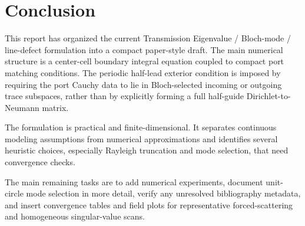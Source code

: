 %
%
%
%
%

\section{Conclusion}

This report has organized the current Transmission Eigenvalue / Bloch-mode /
line-defect formulation into a compact paper-style draft.  The main numerical
structure is a center-cell boundary integral equation coupled to compact port
matching conditions.  The periodic half-lead exterior condition is imposed by
requiring the port Cauchy data to lie in Bloch-selected incoming or outgoing
trace subspaces, rather than by explicitly forming a full half-guide
Dirichlet-to-Neumann matrix.

The formulation is practical and finite-dimensional.  It separates continuous
modeling assumptions from numerical approximations and identifies several
heuristic choices, especially Rayleigh truncation and mode selection, that need
convergence checks.

The main remaining tasks are to add numerical experiments, document unit-circle
mode selection in more detail, verify any unresolved bibliography metadata, and
insert convergence tables and field plots for representative forced-scattering
and homogeneous singular-value scans.
